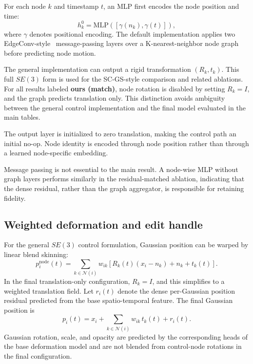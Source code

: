 \documentclass[AMA,Times1COL]{WileyNJDv5} %
\begin{document}
For each node $k$ and timestamp $t$, an MLP first encodes the node position and time:
\begin{equation}\label{eq:nodeenc}
h_k^0=\mathrm{MLP}\!\left([\gamma(n_k),\gamma(t)]\right),
\end{equation}
where $\gamma$ denotes positional encoding. The default implementation applies two EdgeConv-style~\cite{wang2019dgcnn} message-passing layers over a K-nearest-neighbor node graph before predicting node motion.

The general implementation can output a rigid transformation $(R_k,t_k)$. This full $SE(3)$ form is used for the SC-GS-style comparison and related ablations. For all results labeled \textbf{ours (match)}, node rotation is disabled by setting $R_k=I$, and the graph predicts translation only. This distinction avoids ambiguity between the general control implementation and the final model evaluated in the main tables.

The output layer is initialized to zero translation, making the control path an initial no-op. Node identity is encoded through node position rather than through a learned node-specific embedding.

Message passing is not essential to the main result. A node-wise MLP without graph layers performs similarly in the residual-matched ablation, indicating that the dense residual, rather than the graph aggregator, is responsible for retaining fidelity.

\subsection{Weighted deformation and edit handle}

For the general $SE(3)$ control formulation, Gaussian position can be warped by linear blend skinning:
\begin{equation}\label{eq:skin}
p_i^{\mathrm{node}}(t)=\sum_{k\in\mathcal N(i)}w_{ik}
\left[R_k(t)(x_i-n_k)+n_k+t_k(t)\right].
\end{equation}
In the final translation-only configuration, $R_k=I$, and this simplifies to a weighted translation field. Let $r_i(t)$ denote the dense per-Gaussian position residual predicted from the base spatio-temporal feature. The final Gaussian position is
\begin{equation}\label{eq:final}
p_i(t)=x_i+\sum_{k\in\mathcal N(i)}w_{ik}\,t_k(t)+r_i(t).
\end{equation}
Gaussian rotation, scale, and opacity are predicted by the corresponding heads of the base deformation model and are not blended from control-node rotations in the final configuration.
\end{document}
